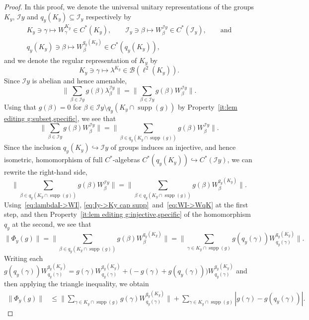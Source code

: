 \documentclass[a4paper, 12pt]{amsart}
\theoremstyle{plain}
\theoremstyle{definition}
\theoremstyle{remark}
\newcommand{\supp}{\operatorname{supp}}
\newcommand{\Bb}{\mathcal{B}}
\newcommand{\Ii}{\mathcal{I}}
\numberwithin{equation}{section}
\begin{document}
\begin{proof}
In this proof, we denote the universal unitary representations of the groups $K_y$, $\Ii y$ and $q_y(K_y) \subseteq \Ii_y$ respectively by
\begin{gather*}
K_y \owns \gamma \mapsto W^{K_y}_\gamma \in C^*(K_y),
    \qquad
    \Ii_y \owns \beta \mapsto W^{\Ii y}_\beta \in C^*(\Ii_y),
    \qquad\text{and}\\
    q_y(K_y) \owns \beta \mapsto W^{q_y(K_y)}_\beta \in C^*(q_y(K_y)),
\end{gather*}
and we denote the regular representation of $K_y$ by
\[
    K_y \owns \gamma \mapsto \lambda^{K_y} \in \Bb(\ell^2(K_y)).
\]
Since $\Ii y$ is abelian and hence amenable,
\begin{equation}\label{eq:lambdaI->WI}
    \Big\|\sum_{\beta  \in \Ii y} g(\beta )\lambda^{\Ii y}_\beta \Big\|
    = \Big\|\sum_{\beta  \in \Ii y} g(\beta )W^{\Ii y}_\beta \Big\|.
\end{equation}
Using that $g(\beta) = 0$ for $\beta \in \Ii y \setminus
q_y(K_y\cap \supp(g))$ by Property~\ref{it:lem editing g:subset,specific}, we see that
\begin{equation}\label{eq:Iy->Ky cap supp}
\Big\|\sum_{\beta \in \Ii y} g(\beta)W^{\Ii y}_\beta\Big\|
    = \Big\|\sum_{\beta \in q_y(K_y\cap \supp(g))} g(\beta)W^{\Ii y}_\beta\Big\|.
\end{equation}
Since the inclusion $q_{y}(K_y) \hookrightarrow \Ii y$ of groups induces an injective, and hence isometric, homomorphism of full $C^*$-algebras
$C^*(q_y(K_y)) \hookrightarrow C^*(\Ii y)$, we can rewrite the right-hand side,
\begin{equation}\label{eq:WI->WqK}
\Big\|\sum_{\beta \in q_y(K_y\cap \supp(g))} g(\beta)W^{\Ii y}_\beta\Big\|
    = \Big\|\sum_{\beta \in q_y(K_y\cap \supp(g))} g(\beta)W^{q_y(K_y)}_\beta\Big\|.
\end{equation}
Using~\eqref{eq:lambdaI->WI}, \eqref{eq:Iy->Ky cap supp}~and~\eqref{eq:WI->WqK} at the first step, and then Property~\ref{it:lem editing g:injective,specific}
of the homomorphism $q_y$ at the second, we see that
\[
\|\Phi_y(g)\|
    = \Big\|\sum_{\beta \in q_y(K_y\cap \supp(g))} g(\beta) W^{q_y(K_y)}_\beta\Big\|
    = \Big\|\sum_{\gamma \in K_y \cap \supp(g)} g(q_y(\gamma)) W^{q_y(K_y)}_{q_y(\gamma)}\Big\|.
\]
Writing each $g(q_y(\gamma)) W^{q_y(K_y)}_{q_y(\gamma)} = g(\gamma) W^{q_y(K_y)}_{q_y(\gamma)} + \big(-g(\gamma) + g(q_y(\gamma))\big)W^{q_y(K_y)}_{q_y(\gamma)}$ and then applying the triangle inequality, we obtain
\begin{align*}
\|\Phi_y(g)\|
    &\le \Big\|\sum_{\gamma \in K_y \cap \supp(g)} g(\gamma) W^{q_y(K_y)}_{q_y(\gamma)}\Big\| + \sum_{\gamma \in K_y \cap \supp(g)} |g(\gamma)- g(q_y(\gamma))|.

\end{align*}
\end{proof}
\end{document}
